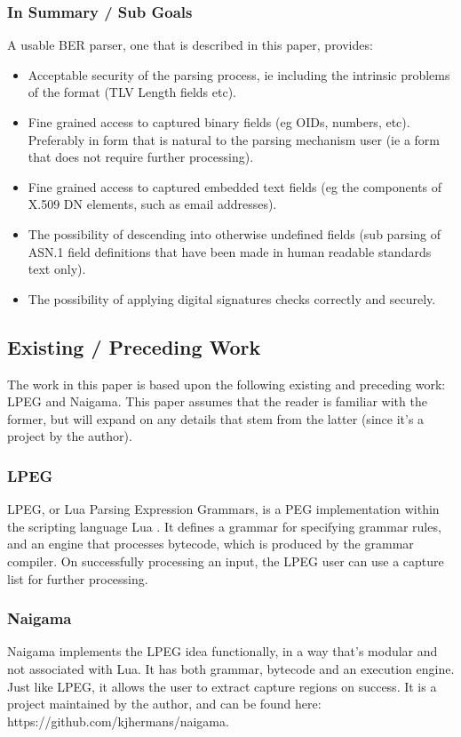 \subsubsection{In Summary / Sub Goals}
A usable BER parser, one that is described in this paper, provides:

\begin{itemize}
    \item Acceptable security of the parsing process, ie including the 
intrinsic problems of the format (TLV Length fields etc).
    \item Fine grained access to captured binary fields (eg OIDs, numbers, 
etc). Preferably in form that is natural to the parsing mechanism user (ie 
a form that does not require further processing).
    \item Fine grained access to captured embedded text fields (eg the 
components of X.509 DN elements, such as email addresses).
    \item The possibility of descending into otherwise undefined fields (sub 
parsing of ASN.1 field definitions that have been made in human readable 
standards text only).
    \item The possibility of applying digital signatures checks correctly 
and securely.
\end{itemize}

\subsection{Existing / Preceding Work}
The work in this paper is based upon the following existing and preceding 
work: LPEG and Naigama. This paper assumes that the reader is familiar 
with the former, but will expand on any details that stem from the latter 
(since it’s a project by the author).

\subsubsection{LPEG}
LPEG, or Lua Parsing Expression Grammars, is a PEG implementation within 
the scripting language Lua \cite{bib:lua} \cite{bib:lpeg}.
It defines a grammar for specifying 
grammar rules, and an engine that processes bytecode, which is produced by 
the grammar compiler. On successfully processing an input, the LPEG user 
can use a capture list for further processing.

\subsubsection{Naigama}
Naigama \cite{bib:naigama}
implements the LPEG idea functionally, in a way that’s 
modular and not associated with Lua. It has both grammar, bytecode and an 
execution engine. Just like LPEG, it allows the user to extract capture 
regions on success. It is a project maintained by the author, and can be 
found here: https://github.com/kjhermans/naigama.

